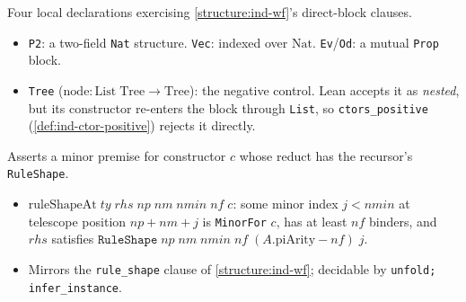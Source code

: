 \begin{example}
  \label{def:iotashape-fixtures-direct}
  \leanok

   Four local declarations exercising \ref{structure:ind-wf}'s direct-block
  clauses.
  \begin{itemize}
  \item \texttt{P2}: a two-field \texttt{Nat} structure. \texttt{Vec}: indexed over
        $\mathrm{Nat}$. \texttt{Ev}/\texttt{Od}: a mutual \texttt{Prop} block.
  \item \texttt{Tree} ($\mathrm{node}:\mathrm{List}\;\mathrm{Tree}\to\mathrm{Tree}$): the negative
        control. Lean accepts it as \emph{nested}, but its constructor re-enters the block through
        \texttt{List}, so \texttt{ctors\_positive} (\ref{def:ind-ctor-positive}) rejects it
        directly.
  \end{itemize}
\end{example}

\begin{example}
  \label{def:iotashape-ruleshapeat}
  \leanok

   Asserts a minor premise for constructor $c$ whose reduct has the recursor's
  \texttt{RuleShape}.
  \begin{itemize}
  \item $\mathrm{ruleShapeAt}\;ty\;rhs\;np\;nm\;nmin\;nf\;c$: some minor index $j<nmin$ at
        telescope position $np+nm+j$ is \texttt{MinorFor} $c$, has at least $nf$ binders, and
        $rhs$ satisfies $\mathtt{RuleShape}\;np\;nm\;nmin\;nf\;(A.\mathrm{piArity}-nf)\;j$.
  \item Mirrors the \texttt{rule\_shape} clause of \ref{structure:ind-wf}; decidable by
        \texttt{unfold; infer\_instance}.
  \end{itemize}
\end{example}


